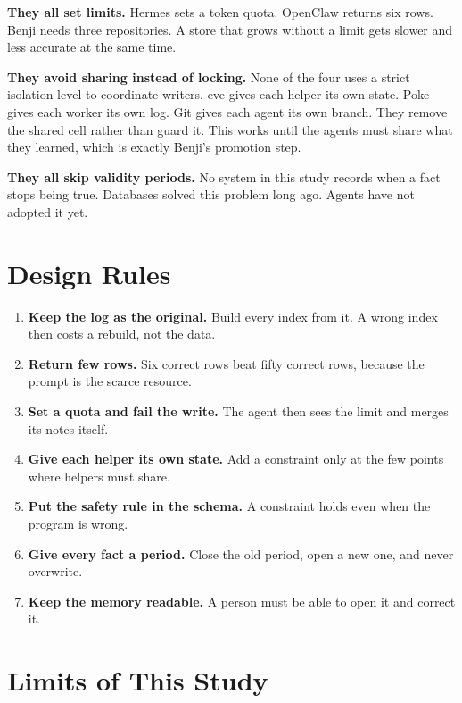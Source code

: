 \documentclass[11pt,a4paper]{article}
\begin{document}
\textbf{They all set limits.} Hermes sets a token quota. OpenClaw returns
six rows. Benji needs three repositories. A store that grows without a
limit gets slower and less accurate at the same time.

\textbf{They avoid sharing instead of locking.} None of the four uses a
strict isolation level to coordinate writers. eve gives each helper its
own state. Poke gives each worker its own log. Git gives each agent its
own branch. They remove the shared cell rather than guard it. This works
until the agents must share what they learned, which is exactly Benji's
promotion step.

\textbf{They all skip validity periods.} No system in this study records
when a fact stops being true. Databases solved this problem long ago.
Agents have not adopted it yet.

\section{Design Rules}

\begin{enumerate}
  \item \textbf{Keep the log as the original.} Build every index from it.
        A wrong index then costs a rebuild, not the data.
  \item \textbf{Return few rows.} Six correct rows beat fifty correct
        rows, because the prompt is the scarce resource.
  \item \textbf{Set a quota and fail the write.} The agent then sees the
        limit and merges its notes itself.
  \item \textbf{Give each helper its own state.} Add a constraint only at
        the few points where helpers must share.
  \item \textbf{Put the safety rule in the schema.} A constraint holds
        even when the program is wrong.
  \item \textbf{Give every fact a period.} Close the old period, open a
        new one, and never overwrite.
  \item \textbf{Keep the memory readable.} A person must be able to open
        it and correct it.
\end{enumerate}

\section{Limits of This Study}
\end{document}
